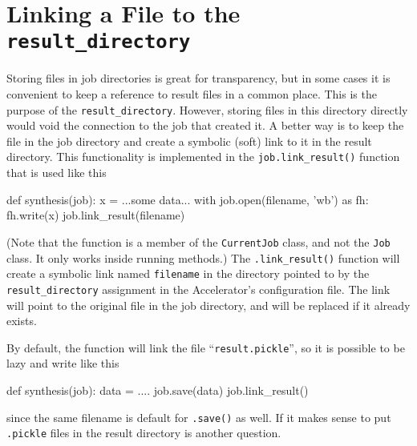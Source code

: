 \section{Linking a File to the \texttt{result\_directory}}
\label{sec:symlinking}
Storing files in job directories is great for transparency, but in
some cases it is convenient to keep a reference to result files in a
common place.  This is the purpose of the \texttt{result\_directory}.
However, storing files in this directory directly would void the
connection to the job that created it.  A better way is to keep the
file in the job directory and create a symbolic (soft) link to it in
the result directory.  This functionality is implemented in the
\texttt{job.link\_result()} function that is used like this
\begin{python}
def synthesis(job):
    x = ...some data...
    with job.open(filename, 'wb') as fh:
        fh.write(x)
    job.link_result(filename)
\end{python}
(Note that the function is a member of the \texttt{CurrentJob} class,
and not the \texttt{Job} class.  It only works inside running
methods.)  The \texttt{.link\_result()} function will create a
symbolic link named \texttt{filename} in the directory pointed to by
the \texttt{result\_directory} assignment in the Accelerator's
configuration file.  The link will point to the original file in the
job directory, and will be replaced if it already exists.

By default, the function will link the file
``\texttt{result.pickle}'', so it is possible to be lazy and write
like this
\begin{python}
def synthesis(job):
    data = ....
    job.save(data)
    job.link_result()
\end{python}
since the same filename is default for \texttt{.save()} as well.  If
it makes sense to put \texttt{.pickle} files in the result directory
is another question.
